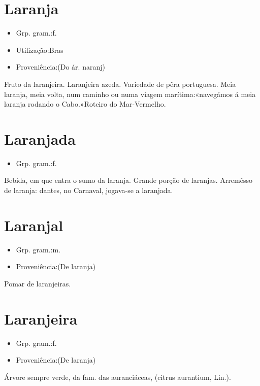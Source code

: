 \section{Laranja}
\begin{itemize}
\item {Grp. gram.:f.}
\end{itemize}
\begin{itemize}
\item {Utilização:Bras}
\end{itemize}
\begin{itemize}
\item {Proveniência:(Do ár. \textunderscore naranj\textunderscore )}
\end{itemize}
Fruto da laranjeira.
Laranjeira azeda.
Variedade de pêra portuguesa.
\textunderscore Meia laranja\textunderscore , meia volta, num caminho ou numa viagem marítima:«\textunderscore navegámos á meia laranja rodando o Cabo.\textunderscore »\textunderscore Roteiro do Mar-Vermelho\textunderscore .
\section{Laranjada}
\begin{itemize}
\item {Grp. gram.:f.}
\end{itemize}
Bebida, em que entra o sumo da laranja.
Grande porção de laranjas.
Arremêsso de laranja: \textunderscore dantes, no Carnaval, jogava-se a laranjada\textunderscore .
\section{Laranjal}
\begin{itemize}
\item {Grp. gram.:m.}
\end{itemize}
\begin{itemize}
\item {Proveniência:(De \textunderscore laranja\textunderscore )}
\end{itemize}
Pomar de laranjeiras.
\section{Laranjeira}
\begin{itemize}
\item {Grp. gram.:f.}
\end{itemize}
\begin{itemize}
\item {Proveniência:(De \textunderscore laranja\textunderscore )}
\end{itemize}
Árvore sempre verde, da fam. das auranciáceas, (\textunderscore citrus aurantium\textunderscore , Lin.).
